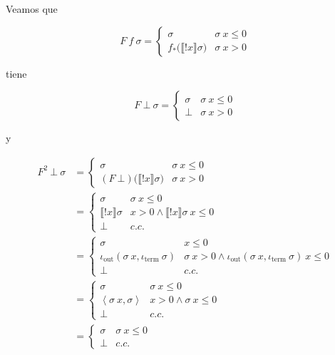 \documentclass[a4paper, 12pt]{article}
\begin{document}
Veamos que 

\begin{equation*}
  F ~ f ~ \sigma = \begin{cases}
    \sigma & \sigma ~ x \leq 0 \\ 
    f_* \big( \llbracket !x \rrbracket\sigma \big) & \sigma ~ x > 0
  \end{cases}
\end{equation*}

tiene 

\begin{equation*}
  F ~ \bot ~ \sigma = \begin{cases}
    \sigma & \sigma ~ x \leq 0 \\ 
    \bot & \sigma ~ x > 0
  \end{cases}
\end{equation*}

y 

\begin{align*}
  F^2 ~ \bot ~ \sigma 
  &= \begin{cases}
    \sigma & \sigma ~ x \leq 0 \\ 
    (F ~ \bot )\big( \llbracket !x \rrbracket\sigma \big) & \sigma ~ x > 0 
  \end{cases} \\ 
  &= \begin{cases}
    \sigma & \sigma ~ x \leq 0 \\ 
    \llbracket !x \rrbracket\sigma & x > 0 \land \llbracket !x \rrbracket\sigma
    ~ x
    \leq 0 \\ 
    \bot &c.c.
  \end{cases} \\ 
  &= \begin{cases}
    \sigma & x \leq 0 \\ 
    \iota_{\text{out}}(\sigma ~ x, \iota_{\text{term}} ~ \sigma) & \sigma ~ x > 0 \land
    \iota_{\text{out}}(\sigma ~ x, \iota_{\text{term}} ~ \sigma) ~ x \leq 0 \\ 
    \bot & c.c.
  \end{cases} \\ 
  &= \begin{cases}
    \sigma & \sigma ~ x \leq 0 \\ 
    \left<\sigma ~ x, \sigma \right> & x > 0 \land \sigma ~ x \leq 0 \\ 
    \bot & c.c.
  \end{cases} \\ 
  &= \begin{cases}
    \sigma & \sigma ~ x \leq 0 \\ 
    \bot  & c.c.
  \end{cases}
\end{align*}
\end{document}
